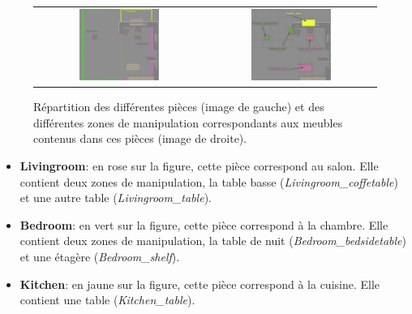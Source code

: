 \documentclass[a4paper,11pt,twoside]{StyleThese}
\begin{document}
\begin{figure}[ht!]
 \centering
 \begin{tabular}{cc}
  \includegraphics[width=0.49\textwidth]{img/areas.jpg} &
  \includegraphics[width=0.49\textwidth]{img/furnitures.jpg}
 \end{tabular}
 \caption{Répartition des différentes pièces (image de gauche) et des différentes zones de manipulation correspondants aux meubles contenus dans ces pièces (image de droite).}
 \label{fig:areasMardi}
 \end{figure}

\begin{itemize}
\item \textbf{Livingroom}: en rose sur la figure, cette pièce correspond au salon.
Elle contient deux zones de manipulation, la table basse (\textit{Livingroom\_coffetable}) et une autre table (\textit{Livingroom\_table}).

\item \textbf{Bedroom}: en vert sur la figure, cette pièce correspond à la chambre. Elle contient deux zones de manipulation, la table de nuit (\textit{Bedroom\_bedsidetable}) et une étagère (\textit{Bedroom\_shelf}).

\item \textbf{Kitchen}: en jaune sur la figure, cette pièce correspond à la cuisine. Elle contient une table (\textit{Kitchen\_table}).
\end{itemize}
\end{document}
